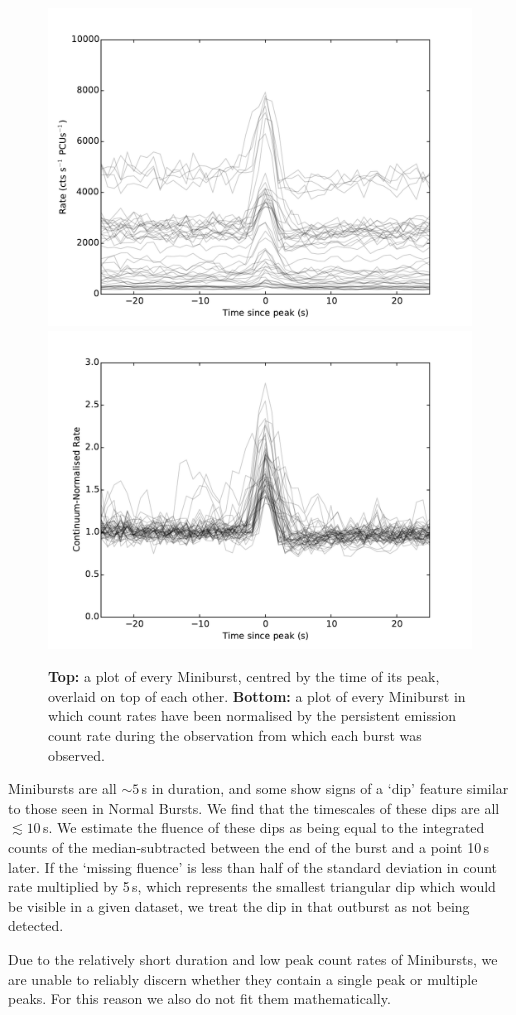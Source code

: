 \begin{figure}
  \centering
  \includegraphics[width=.9\linewidth, trim={0.4cm 0 1.1cm 0},clip]{images/1000mini.pdf}
  \includegraphics[width=.9\linewidth, trim={0.4cm 0 1.1cm 0},clip]{images/1000mini_renormed.pdf}
  \caption{\small  \textbf{Top:} a plot of every Miniburst, centred by the time of its peak, overlaid on top of each other.  \textbf{Bottom:} a plot of every Miniburst in which count rates have been normalised by the persistent emission count rate during the observation from which each burst was observed.}
  \label{fig:mini_over}
\end{figure}

\par Minibursts are all $\sim5$\,s in duration, and some show signs of a `dip' feature similar to those seen in Normal Bursts.  We find that the timescales of these dips are all $\lesssim10$\,s.  We estimate the fluence of these dips as being equal to the integrated counts of the median-subtracted between the end of the burst and a point 10\,s later.  If the `missing fluence' is less than half of the standard deviation in count rate multiplied by 5\,s, which represents the smallest triangular dip which would be visible in a given dataset, we treat the dip in that outburst as not being detected.
\par Due to the relatively short duration and low peak count rates of Minibursts, we are unable to reliably discern whether they contain a single peak or multiple peaks.  For this reason we also do not fit them mathematically.

